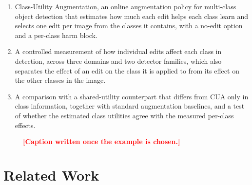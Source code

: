 \documentclass[conference]{IEEEtran}
\newcommand{\todo}[1]{\textcolor{red}{\textbf{[#1]}}}
\begin{document}
\begin{enumerate}
    \item Class-Utility Augmentation, an online augmentation policy for multi-class object detection that estimates how much each edit helps each class learn and selects one edit per image from the classes it contains, with a no-edit option and a per-class harm block.
    \item A controlled measurement of how individual edits affect each class in detection, across three domains and two detector families, which also separates the effect of an edit on the class it is applied to from its effect on the other classes in the image.
    \item A comparison with a shared-utility counterpart that differs from CUA only in class information, together with standard augmentation baselines, and a test of whether the estimated class utilities agree with the measured per-class effects.
\end{enumerate}

\begin{figure}[t]
\centering
{}
\caption[Teaser]{\todo{Caption written once the example is chosen.}}
\label{fig:teaser}
\end{figure}

\section{Related Work}
\label{sec:related}
\end{document}
